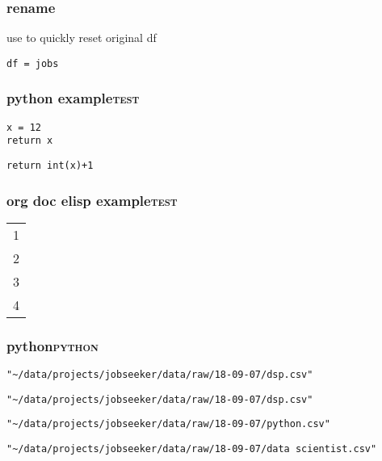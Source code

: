 \documentclass[11pt]{article}
\begin{document}
\subsubsection{rename}
\label{sec:orgcb33b0b}
use to quickly reset original df
\begin{verbatim}
df = jobs
\end{verbatim}

\subsubsection{python example\hfill{}\textsc{test}}
\label{sec:org304b20a}
\begin{verbatim}
x = 12
return x
\end{verbatim}

\begin{verbatim}
return int(x)+1
\end{verbatim}

\subsubsection{org doc elisp example\hfill{}\textsc{test}}
\label{sec:orgcacffd1}
\begin{center}
\label{tab:org40e6bf5}
\begin{tabular}{r}
1\\
2\\
3\\
4\\
\end{tabular}
\end{center}

\subsubsection{python\hfill{}\textsc{python}}
\label{sec:org6803f30}
\begin{verbatim}
"~/data/projects/jobseeker/data/raw/18-09-07/dsp.csv"
\end{verbatim}

\begin{verbatim}
"~/data/projects/jobseeker/data/raw/18-09-07/dsp.csv"
\end{verbatim}

\begin{verbatim}
"~/data/projects/jobseeker/data/raw/18-09-07/python.csv"
\end{verbatim}

\begin{verbatim}
"~/data/projects/jobseeker/data/raw/18-09-07/data scientist.csv"
\end{verbatim}
\end{document}
